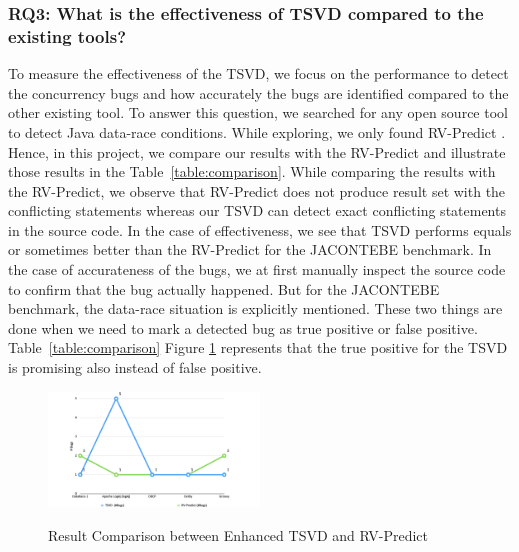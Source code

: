 \subsubsection{RQ3: What is the effectiveness of TSVD compared to the existing tools?}
To measure the effectiveness of the TSVD, we focus on the performance to detect the concurrency bugs and how accurately the bugs are identified compared to the other existing tool. To answer this question, we searched for any open source tool to
detect Java data-race conditions. While exploring, we only found RV-Predict
\cite{rv-predict}. Hence, in this project, we compare our results with the RV-Predict and
illustrate those results in the Table~\ref{table:comparison}. While comparing the results with the
RV-Predict, we observe that RV-Predict does not produce result set with the
conflicting statements whereas our TSVD can detect exact conflicting
statements in the source code. In the case of effectiveness, we see that TSVD
performs equals or sometimes better than the RV-Predict for the JACONTEBE
benchmark. In the case of accurateness of the bugs, we at first manually
inspect the source code to confirm that the bug actually happened. But for
the JACONTEBE benchmark, the data-race situation is explicitly mentioned.
These two things are done when we need to mark a detected bug as true positive
or false positive. Table~\ref{table:comparison} Figure \ref{fig:comparison}  represents that the true positive for the TSVD
is promising also instead of false positive.



\begin{figure}

	\includegraphics[width=0.5\textwidth]{images/graph.png}
	\label{fig:comparison}
	\caption{Result Comparison between Enhanced TSVD and RV-Predict}
\end{figure}


